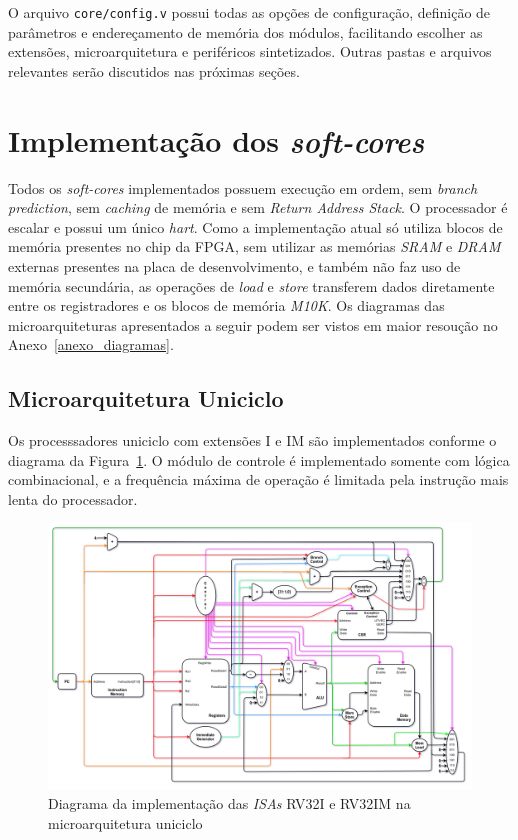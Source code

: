     {
        O arquivo \texttt{core/config.v} possui todas as opções de configuração,
        definição de parâmetros e endereçamento de memória dos módulos, facilitando
        escolher as extensões, microarquitetura e periféricos sintetizados. Outras
        pastas e arquivos relevantes serão discutidos nas próximas seções.
    }


\section{Implementação dos \textit{soft-cores}}
    { Todos os \textit{soft-cores} implementados possuem execução em ordem, sem
        \textit{branch prediction}, sem \textit{caching} de memória e sem
        \textit{Return Address Stack}. O processador é escalar e possui um
        único \textit{hart}. Como a implementação atual só utiliza blocos de
        memória presentes no chip da FPGA, sem utilizar as memórias
        \textit{SRAM} e \textit{DRAM} externas presentes na placa de
        desenvolvimento, e também não faz uso de memória secundária, as operações
        de \textit{load} e \textit{store} transferem dados diretamente entre os
        registradores e os blocos de memória \textit{M10K}.
        Os diagramas das microarquiteturas apresentados a seguir podem ser vistos
        em maior resoução no Anexo~\ref{anexo_diagramas}.
    }

    \subsection{Microarquitetura Uniciclo}

        { Os processsadores uniciclo com extensões I e IM são implementados
            conforme o diagrama da Figura~\ref{fig:diagram_rv32i_uni}. O módulo
            de controle é implementado somente com lógica combinacional, e a
            frequência máxima de operação é limitada pela instrução mais lenta
            do processador.
        }

        \begin{figure}[H]
        \centering
            \includegraphics[width=.9\linewidth]{../images/uarch_diagrams/singlecycle-RV32I-RV32IM.png}
            \caption{Diagrama da implementação das \textit{ISAs} RV32I e RV32IM na
            microarquitetura uniciclo}\label{fig:diagram_rv32i_uni}
        \end{figure}

